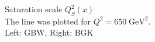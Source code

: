 \documentclass[11pt]{article}
\begin{document}
\begin{figure}[t]
\caption{Saturation scale $Q_S^2(x)$\\
The line was plotted for $Q^2=650\;\mathrm{ GeV^2}$.\\Left: GBW, Right: BGK }
\label{fig:critical}
\end{figure}
\end{document}

